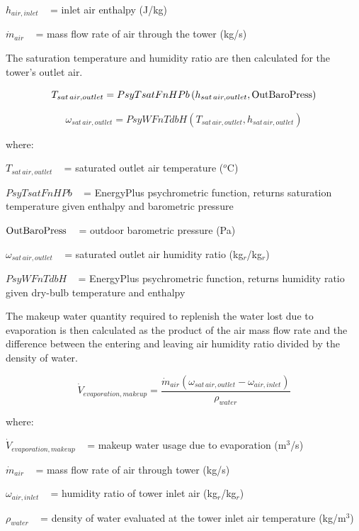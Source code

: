 \({h_{air,inlet}}\) ~ = inlet air enthalpy (J/kg)

\({\dot m_{air}}\) ~ = mass flow rate of air through the tower (kg/s)

The saturation temperature and humidity ratio are then calculated for the tower's outlet air.

\begin{equation}
{T_{sat\,air,outlet}} = PsyTsatFnHPb\left( {{h_{sat\,air,outlet}},{\rm{OutBaroPress}}} \right)
\end{equation}

\begin{equation}
{\omega_{sat\,air,outlet}} = PsyWFnTdbH\left( {{T_{sat\,air,outlet}},{h_{sat\,air,outlet}}} \right)
\end{equation}

where:

\({T_{sat\,air,outlet}}\) ~ = saturated outlet air temperature (\(^{o}\)C)

\(PsyTsatFnHPb\) ~ = EnergyPlus psychrometric function, returns saturation temperature given enthalpy and barometric pressure

\({\rm{OutBaroPress}}\) ~ = outdoor barometric pressure (Pa)

\({\omega_{sat\,air,outlet}}\) ~ = saturated outlet air humidity ratio (kg\(_{r}\)/kg\(_{r}\))

\(PsyWFnTdbH\) ~ = EnergyPlus psychrometric function, returns humidity ratio given dry-bulb temperature and enthalpy

The makeup water quantity required to replenish the water lost due to evaporation is then calculated as the product of the air mass flow rate and the difference between the entering and leaving air humidity ratio divided by the density of water.

\begin{equation}
{\dot V_{evaporation,makeup}} = \frac{{{{\dot m}_{air}}\left( {{\omega_{sat\,air,outlet}} - {\omega_{air,inlet}}} \right)}}{{{\rho_{water}}}}
\end{equation}

where:

\({\dot V_{evaporation,makeup}}\) ~ = makeup water usage due to evaporation (m\(^{3}\)/s)

\({\dot m_{air}}\) ~ = mass flow rate of air through tower (kg/s)

\({\omega_{air,inlet}}\) ~ = humidity ratio of tower inlet air (kg\(_{r}\)/kg\(_{r}\))

\({\rho_{water}}\) ~ = density of water evaluated at the tower inlet air temperature (kg/m\(^{3}\))


